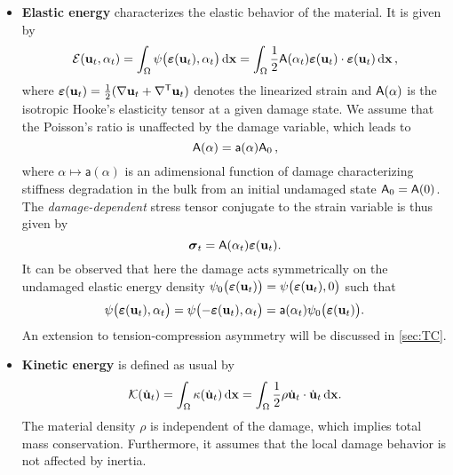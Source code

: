 \begin{itemize}
\item \textbf{Elastic energy} characterizes the elastic behavior of the material. It is given by
\begin{equation} \label{eq:elasticG}
\mathcal{E}(\vec{u}_t,\alpha_t)=\int_\Omega\psi\bigl(\eps(\vec{u}_t),\alpha_t\bigr)\dx=\int_\Omega\frac{1}{2}\tens{A}(\alpha_t)\eps(\vec{u}_t)\cdot\eps(\vec{u}_t)\dx\,,
\end{equation}
where $\eps(\vec{u}_t)=\frac{1}{2}(\nabla\vec{u}_t+\nabla^\mT\vec{u}_t)$ denotes the linearized strain and $\mathsf{A}(\alpha)$ is the isotropic Hooke's elasticity tensor at a given damage state. We assume that the Poisson's ratio is unaffected by the damage variable, which leads to
\[
\mathsf{A}(\alpha)=\mathsf{a}(\alpha)\mathsf{A}_0\,,
\]
where $\alpha\mapsto\mathsf{a}(\alpha)$ is an adimensional function of damage characterizing stiffness degradation in the bulk from an initial undamaged state $\mathsf{A}_0=\mathsf{A}(0)$. The \emph{damage-dependent} stress tensor conjugate to the strain variable is thus given by
\begin{equation} \label{eq:stress}
\sig_t=\tens{A}(\alpha_t)\eps(\vec{u}_t).
\end{equation}
It can be observed that here the damage acts symmetrically on the undamaged elastic energy density $\psi_0\bigl(\eps(\vec{u}_t)\bigr)=\psi\bigl(\eps(\vec{u}_t),0\bigr)$ such that
\begin{equation} \label{eq:psi0}
\psi\bigl(\eps(\vec{u}_t),\alpha_t\bigr)=\psi\bigl(-\eps(\vec{u}_t),\alpha_t\bigr)=\mathsf{a}(\alpha_t)\psi_0\bigl(\eps(\vec{u}_t)\bigr).
\end{equation}
An extension to tension-compression asymmetry will be discussed in \cref{sec:TC}.

\item \textbf{Kinetic energy} is defined as usual by
\begin{equation} \label{eq:kineticG}
\mathcal{K}(\dot{\vec{u}}_t)=\int_\Omega\kappa(\dot{\vec{u}}_t)\dx=\int_\Omega\frac{1}{2}\rho\dot{\vec{u}}_t\cdot\dot{\vec{u}}_t\dx.
\end{equation}
The material density $\rho$ is independent of the damage, which implies total mass conservation. Furthermore, it assumes that the local damage behavior is not affected by inertia.


\end{itemize}
